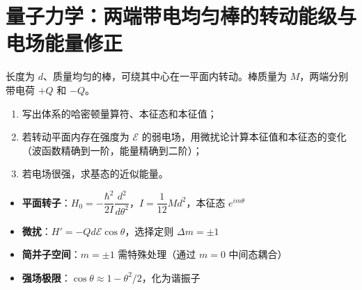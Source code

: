 \section{量子力学：两端带电均匀棒的转动能级与电场能量修正}
\label{sec:charged-rod-rotor}

\begin{modelbox}[题目：两端带电均匀棒的转动能级与电场能量修正]
长度为 $d$、质量均匀的棒，可绕其中心在一平面内转动。棒质量为 $M$，两端分别带电荷 $+Q$ 和 $-Q$。
\begin{enumerate}
    \item 写出体系的哈密顿量算符、本征态和本征值；
    \item 若转动平面内存在强度为 $\mathcal{E}$ 的弱电场，用微扰论计算本征值和本征态的变化（波函数精确到一阶，能量精确到二阶）；
    \item 若电场很强，求基态的近似能量。
\end{enumerate}
\end{modelbox}

\begin{tipbox}[考点快速分析]
\begin{itemize}
    \item \textbf{平面转子}：$H_0=-\dfrac{\hbar^2}{2I}\dfrac{d^2}{d\theta^2}$，$I=\dfrac{1}{12}Md^2$，本征态 $e^{im\theta}$
    \item \textbf{微扰}：$H'=-Qd\mathcal{E}\cos\theta$，选择定则 $\Delta m=\pm1$
    \item \textbf{简并子空间}：$m=\pm1$ 需特殊处理（通过 $m=0$ 中间态耦合）
    \item \textbf{强场极限}：$\cos\theta\approx1-\theta^2/2$，化为谐振子
\end{itemize}
\end{tipbox}

